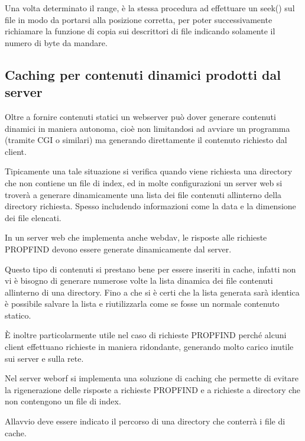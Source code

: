 \documentclass[a4paper,11pt]{article}
\begin{document}
{\sffamily
Una volta determinato il range, \`e la stessa procedura ad effettuare un
seek() sul file in modo da portarsi alla posizione corretta, per poter
successivamente richiamare la funzione di copia sui descrittori di file
indicando solamente il numero di byte da mandare.}


\bigskip

\subsection{Caching per contenuti dinamici prodotti dal server}
{\sffamily
Oltre a fornire contenuti statici un webserver pu\`o dover generare
contenuti dinamici in maniera autonoma, cio\`e non limitandosi ad
avviare un programma (tramite CGI o similari) ma generando direttamente
il contenuto richiesto dal client.}

{\sffamily
Tipicamente una tale situazione si verifica quando viene richiesta una
directory che non contiene un file di index, ed in molte configurazioni
un server web si trover\`a a generare dinamicamente una lista dei file
contenuti all{\textquotesingle}interno della directory richiesta.
Spesso includendo informazioni come la data e la dimensione dei file
elencati.}

{\sffamily
In un server web che implementa anche webdav, le risposte alle richieste
PROPFIND devono essere generate dinamicamente dal server.}


\bigskip

{\sffamily
Questo tipo di contenuti si prestano bene per essere inseriti in cache,
infatti non vi \`e bisogno di generare numerose volte la lista dinamica
dei file contenuti all{\textquotesingle}interno di una directory. Fino
a che si \`e certi che la lista generata sar\`a identica \`e possibile
salvare la lista e riutilizzarla come se fosse un normale contenuto
statico.}


\bigskip

{\sffamily
\`E inoltre particolarmente utile nel caso di richieste PROPFIND
perch\'e alcuni client effettuano richieste in maniera ridondante,
generando molto carico inutile sui server e sulla rete\cite{BUG02}.}


\bigskip

{\sffamily
Nel server weborf si implementa una soluzione di caching che permette di
evitare la rigenerazione delle risposte a richieste PROPFIND e a
richieste a directory che non contengono un file di index.}

{\sffamily
All{\textquotesingle}avvio deve essere indicato il percorso di una
directory che conterr\`a i file di cache.}
\end{document}
